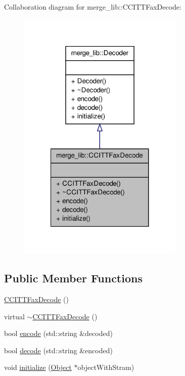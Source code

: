 Collaboration diagram for merge\-\_\-lib\-:\-:C\-C\-I\-T\-T\-Fax\-Decode\-:
\nopagebreak
\begin{figure}[H]
\begin{center}
\leavevmode
\includegraphics[width=224pt]{da/d28/classmerge__lib_1_1_c_c_i_t_t_fax_decode__coll__graph}
\end{center}
\end{figure}
\subsection*{Public Member Functions}
\begin{DoxyCompactItemize}
\item 
\hyperlink{classmerge__lib_1_1_c_c_i_t_t_fax_decode_a61b08132e5811e48300767992bf566d2}{C\-C\-I\-T\-T\-Fax\-Decode} ()
\item 
virtual \hyperlink{classmerge__lib_1_1_c_c_i_t_t_fax_decode_a037b2bd79c20622b6d31655b56d7b756}{$\sim$\-C\-C\-I\-T\-T\-Fax\-Decode} ()
\item 
bool \hyperlink{classmerge__lib_1_1_c_c_i_t_t_fax_decode_a04178b0598e105fa84bb8c766c3d7473}{encode} (std\-::string \&decoded)
\item 
bool \hyperlink{classmerge__lib_1_1_c_c_i_t_t_fax_decode_a0abbba38bcd4d445d2643fbc77e35b5d}{decode} (std\-::string \&encoded)
\item 
void \hyperlink{classmerge__lib_1_1_c_c_i_t_t_fax_decode_a6076aeb278728064c451a079554f962f}{initialize} (\hyperlink{classmerge__lib_1_1_object}{Object} $\ast$object\-With\-Stram)
\end{DoxyCompactItemize}


